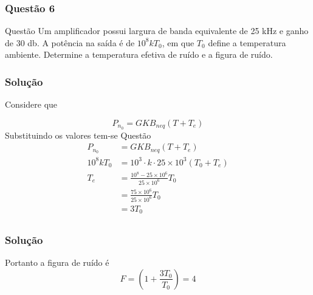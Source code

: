 \documentclass[aspectratio=169,dvipsnames]{beamer}
\begin{document}
\begin{frame}
  \frametitle{Questão 6}


  \begin{block}{Questão}
    Um amplificador possui largura de banda equivalente de 25 \si{\kilo\hertz} e ganho de 30 \si{\decibel}. A potência na saída é 
    de $10^8 k T_0$, em que $T_0$  define a temperatura ambiente. Determine a temperatura efetiva de ruído e a
    figura de ruído.
  \end{block}
  

\end{frame}








\begin{frame}
  \frametitle{Solução}

    Considere  que 

$$
P_{n_0} = GK B_{neq} (T + T_e)
$$
Substituindo os valores tem-se Questão
\begin{align*}
  P_{n_0} &= GK B_{neq} (T + T_e) \\
  10^8 k T_0&= 10^{3} \cdot k \cdot 25 \times 10^{3} (T_0 + T_e) \\
  T_e &= \frac{10^8 - 25 \times 10^{6}}{ 25 \times 10^{6}}T_0  \\
  &= \frac{75 \times 10^{6}}{ 25 \times 10^{6}}T_0  \\
  &= 3T_0  \\
\end{align*}
\end{frame}

\begin{frame}
  \frametitle{Solução}

  Portanto a figura de ruído é
$$
F = \left(1 + \frac{3T_0}{T_0}\right) = 4
$$ 

\end{frame}
\end{document}
